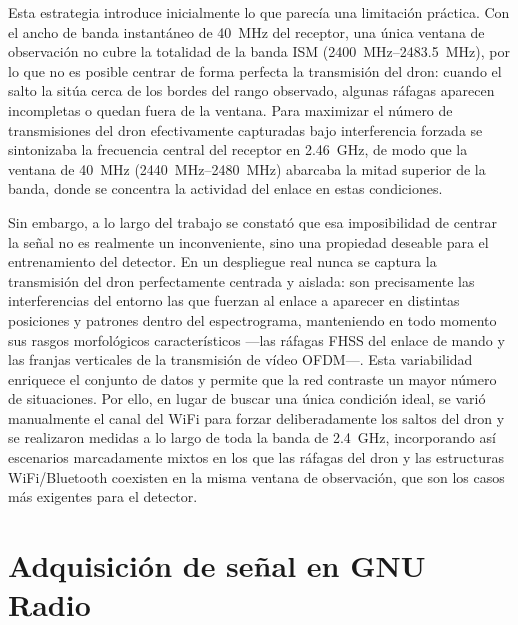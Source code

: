 \vspace{1em}
Esta estrategia introduce inicialmente lo que parecía una limitación práctica. Con el ancho de banda instantáneo de \SI{40}{\mega\hertz} del receptor, una única ventana de observación no cubre la totalidad de la banda ISM (\SIrange{2400}{2483.5}{\mega\hertz}), por lo que no es posible centrar de forma perfecta la transmisión del dron: cuando el salto la sitúa cerca de los bordes del rango observado, algunas ráfagas aparecen incompletas o quedan fuera de la ventana. Para maximizar el número de transmisiones del dron efectivamente capturadas bajo interferencia forzada se sintonizaba la frecuencia central del receptor en \SI{2.46}{\giga\hertz}, de modo que la ventana de \SI{40}{\mega\hertz} (\SIrange{2440}{2480}{\mega\hertz}) abarcaba la mitad superior de la banda, donde se concentra la actividad del enlace en estas condiciones.

\vspace{1em}
Sin embargo, a lo largo del trabajo se constató que esa imposibilidad de centrar la señal no es realmente un inconveniente, sino una propiedad deseable para el entrenamiento del detector. En un despliegue real nunca se captura la transmisión del dron perfectamente centrada y aislada: son precisamente las interferencias del entorno las que fuerzan al enlace a aparecer en distintas posiciones y patrones dentro del espectrograma, manteniendo en todo momento sus rasgos morfológicos característicos —las ráfagas FHSS del enlace de mando y las franjas verticales de la transmisión de vídeo OFDM—. Esta variabilidad enriquece el conjunto de datos y permite que la red contraste un mayor número de situaciones. Por ello, en lugar de buscar una única condición ideal, se varió manualmente el canal del WiFi para forzar deliberadamente los saltos del dron y se realizaron medidas a lo largo de toda la banda de \SI{2.4}{\giga\hertz}, incorporando así escenarios marcadamente mixtos en los que las ráfagas del dron y las estructuras WiFi/Bluetooth coexisten en la misma ventana de observación, que son los casos más exigentes para el detector.

\section{Adquisición de señal en GNU Radio}
\label{sec:adquisicion_gnuradio}













